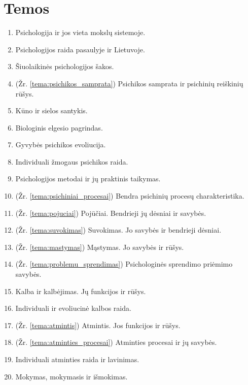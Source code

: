 \chapter{Temos}

\begin{enumerate}
  \item \label{tema_01} Psichologija ir jos vieta mokslų sistemoje.
  \item \label{tema_02} Psichologijos raida pasaulyje ir Lietuvoje.
  \item \label{tema_03} Šiuolaikinės psichologijos šakos.
  \item \label{tema_04} (Žr. \ref{tema:psichikos_samprata})
    Psichikos samprata ir psichinių reiškinių rūšys.
  \item \label{tema_05} Kūno ir sielos santykis.
  \item \label{tema_06} Biologinis elgesio pagrindas.
  \item \label{tema_07} Gyvybės psichikos evoliucija.
  \item \label{tema_10} Individuali žmogaus psichikos raida.
  \item \label{tema_11} Psichologijos metodai ir jų praktinis taikymas.
  \item \label{tema_12} (Žr. \ref{tema:psichiniai_procesai})
    Bendra psichinių procesų charakteristika.
  \item \label{tema_13} (Žr. \ref{tema:pojuciai})
    Pojūčiai. Bendrieji jų dėsniai ir savybės.
  \item \label{tema_14} (Žr. \ref{tema:suvokimas})
    Suvokimas. Jo savybės ir bendrieji dėsniai.
  \item \label{tema_15} (Žr. \ref{tema:mastymas})
    Mąstymas. Jo savybės ir rūšys.
  \item \label{tema_16} (Žr. \ref{tema:problemu_sprendimas})
    Psichologinės sprendimo priėmimo savybės.
  \item \label{tema_17} Kalba ir kalbėjimas. Jų funkcijos ir rūšys.
  \item \label{tema_20} Individuali ir evoliucinė kalbos raida.
  \item \label{tema_21} (Žr. \ref{tema:atmintis})
    Atmintis. Jos funkcijos ir rūšys.
  \item \label{tema_22} (Žr. \ref{tema:atminties_procesai})
    Atminties procesai ir jų savybės.
  \item \label{tema_23} Individuali atminties raida ir lavinimas.
  \item \label{tema_24} Mokymas, mokymasis ir išmokimas.

\end{enumerate}
